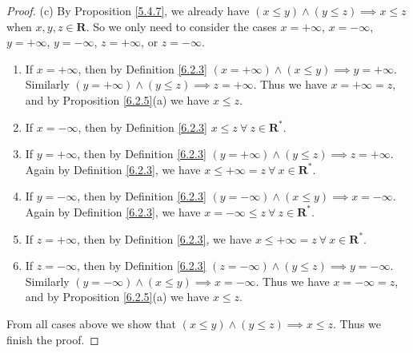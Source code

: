 \begin{proof}{(c)}
By Proposition \ref{5.4.7}, we already have \((x \leq y) \land (y \leq z) \implies x \leq z\) when \(x, y, z \in \mathbf{R}\).
So we only need to consider the cases \(x = +\infty\), \(x = -\infty\), \(y = +\infty\), \(y = -\infty\), \(z = +\infty\), or \(z = -\infty\).
\begin{enumerate}[label=(\Roman*)]
    \item If \(x = +\infty\), then by Definition \ref{6.2.3} \((x = +\infty) \land (x \leq y) \implies y = +\infty\).
    Similarly \((y = +\infty) \land (y \leq z) \implies z = +\infty\).
    Thus we have \(x = +\infty = z\), and by Proposition \ref{6.2.5}(a) we have \(x \leq z\).
    \item If \(x = -\infty\), then by Definition \ref{6.2.3} \(x \leq z \ \forall\ z \in \mathbf{R}^*\).
    \item If \(y = +\infty\), then by Definition \ref{6.2.3} \((y = +\infty) \land (y \leq z) \implies z = +\infty\).
    Again by Definition \ref{6.2.3}, we have \(x \leq +\infty = z \ \forall\ x \in \mathbf{R}^*\).
    \item If \(y = -\infty\), then by Definition \ref{6.2.3} \((y = -\infty) \land (x \leq y) \implies x = -\infty\).
    Again by Definition \ref{6.2.3}, we have \(x = -\infty \leq z \ \forall\ z \in \mathbf{R}^*\).
    \item If \(z = +\infty\), then by Definition \ref{6.2.3}, we have \(x \leq +\infty = z \ \forall\ x \in \mathbf{R}^*\).
    \item If \(z = -\infty\), then by Definition \ref{6.2.3} \((z = -\infty) \land (y \leq z) \implies y = -\infty\).
    Similarly \((y = -\infty) \land (x \leq y) \implies x = -\infty\).
    Thus we have \(x = -\infty = z\), and by Proposition \ref{6.2.5}(a) we have \(x \leq z\).
\end{enumerate}
From all cases above we show that \((x \leq y) \land (y \leq z) \implies x \leq z\).
Thus we finish the proof.
\end{proof}

